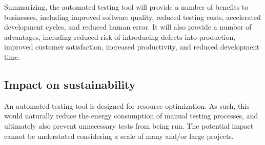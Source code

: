 \documentclass[a4paper, 12pt]{article}
\begin{document}
Summarizing, the automated testing tool will provide a number of benefits to businesses, including improved software quality, reduced testing costs, accelerated development cycles, and reduced human error. It will also provide a number of advantages, including reduced risk of introducing defects into production, improved customer satisfaction, increased productivity, and reduced development time.


\subsection{Impact on sustainability}
An automated testing tool is designed for resource optimization. As such, this would naturally reduce the energy consumption of manual testing processes, and ultimately also prevent unnecessary tests from being run. The potential impact cannot be understated considering a scale of many and/or large projects.
\end{document}
